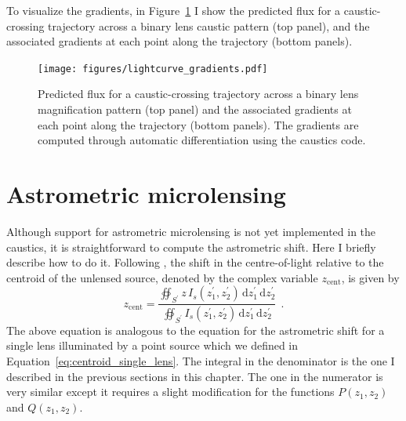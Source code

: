 \documentclass[12pt,dvipsnames]{report}
\newcommand{\ud}{\,\mathrm{d}}
\newcommand{\ssf}[1]{\textsf{#1}}
\newcommand{\hquad}{~~}
\begin{document}
To visualize the gradients, in 
Figure~\ref{fig:lightcurve_gradients} I show the predicted flux for a caustic-crossing trajectory 
across a binary lens caustic pattern (top panel), and the associated gradients at 
each point along the trajectory (bottom panels). 

\begin{figure}[t]
    \begin{centering}
        \texttt{[image: figures/lightcurve\_gradients.pdf]}
        \caption{Predicted flux for a caustic-crossing trajectory across a binary lens
        magnification pattern (top panel) and the associated gradients at each point
        along the trajectory (bottom panels). The gradients are computed through 
        automatic differentiation using the \ssf{caustics} code.}
            \label{fig:lightcurve_gradients}
    \end{centering}
\end{figure}

\section{Astrometric microlensing}
\label{sec:caustics_astrometric_microlensing}
Although support for astrometric microlensing is not yet implemented in the \ssf{caustics},
it is straightforward to compute the astrometric shift. 
Here I briefly describe how to do it.
Following  \citet{1998A&A...333L..79D}, the shift in the centre-of-light relative to the 
centroid of the unlensed source, denoted by the complex variable $z_\mathrm{cent}$, is given by 
\begin{equation}
    z_\mathrm{cent} = \frac{\oiint_{{S}^\prime}z\,I_s(z_1^\prime,z_2^\prime)\ud z_1^\prime\ud z_2^\prime}{
    \oiint_{{S}^\prime}I_s(z_1^\prime,z_2^\prime)\ud z_1^\prime\ud z_2^\prime}{
    }
    \hquad.
    \label{eq:centroid_shift}
\end{equation}
The above equation is analogous to the equation for the astrometric shift for a single lens 
illuminated by a point source which we defined in 
Equation~\ref{eq:centroid_single_lens}.
The integral in the denominator is the one I described in the previous sections in this chapter.
The one in the numerator is very similar except it requires a slight modification for the 
functions $P(z_1,z_2)$ and $Q(z_1,z_2)$. 
\end{document}
